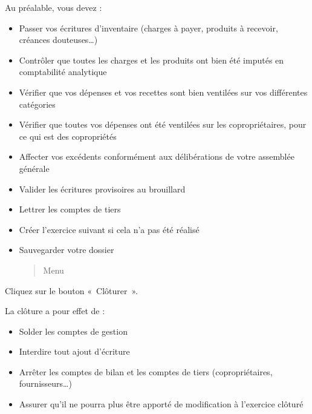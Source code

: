 \documentclass[a4paper,10pt,oneside,french]{sphinxmanual}
\begin{document}
\sphinxAtStartPar
Au préalable, vous devez :
\begin{itemize}
\item {} 
\sphinxAtStartPar
Passer vos écritures d’inventaire (charges à payer, produits à recevoir, créances douteuses…)

\item {} 
\sphinxAtStartPar
Contrôler que toutes les charges et les produits ont bien été imputés en comptabilité analytique

\item {} 
\sphinxAtStartPar
Vérifier que vos dépenses et vos recettes sont bien ventilées sur vos différentes catégories

\item {} 
\sphinxAtStartPar
Vérifier que toutes vos dépenses ont été ventilées sur les copropriétaires, pour ce qui est des copropriétés

\item {} 
\sphinxAtStartPar
Affecter vos excédents conformément aux délibérations de votre assemblée générale

\item {} 
\sphinxAtStartPar
Valider les écritures provisoires au brouillard

\item {} 
\sphinxAtStartPar
Lettrer les comptes de tiers

\item {} 
\sphinxAtStartPar
Créer l’exercice suivant si cela n’a pas été réalisé

\item {} 
\sphinxAtStartPar
Sauvegarder votre dossier
\begin{quote}

\sphinxAtStartPar
Menu 
\end{quote}

\end{itemize}

\sphinxAtStartPar
Cliquez sur le bouton « Clôturer ».

\sphinxAtStartPar
La clôture a pour effet de :
\begin{itemize}
\item {} 
\sphinxAtStartPar
Solder les comptes de gestion

\item {} 
\sphinxAtStartPar
Interdire tout ajout d’écriture

\item {} 
\sphinxAtStartPar
Arrêter les comptes de bilan et les comptes de tiers (copropriétaires, fournisseurs…)

\item {} 
\sphinxAtStartPar
Assurer qu’il ne pourra plus être apporté de modification à l’exercice clôturé

\end{itemize}
\end{document}
